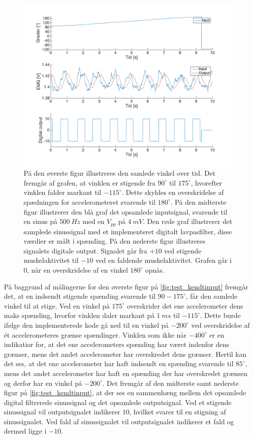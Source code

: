 \begin{figure}[H]
\centering
\includegraphics[width=1\textwidth]{figures/kontrol_test_sinus}
\caption{På den øverste figur illustreres den samlede vinkel over tid. Det fremgår af grafen, at vinklen er stigende fra $90^{\circ}$ til $175^{\circ}$, hvorefter vinklen falder markant til $-115^{\circ}$. Dette skyldes en overskridelse af spædningen for accelerometeret svarende til $180^{\circ}$.
På den midterste figur illustrerer den blå graf det opsamlede inputsignal, svarende til en sinus på $500~Hz$ med en $V_{pp}$ på $4~mV$. Den røde graf illustrerer det samplede sinussignal med et implementeret digitalt lavpasfilter, disse værdier er målt i spænding. 
På den nederste figur illustreres signalets digitale output. Signalet går fra $+10$ ved stigende muskelaktivitet til $-10$ ved en faldende muskelaktivitet. Grafen går i $0$, når en overskridelse af en vinkel $180^{\circ}$ opnås.}
\label{fig:test_kendtinput}
\end{figure}

\noindent
På baggrund af målingerne for den øverste figur på \autoref{fig:test_kendtinput} fremgår det, at en indsendt stigende spænding svarende til $90-175^{\circ}$, får den samlede vinkel til at stige. Ved en vinkel på $175^{\circ}$ overskrider det ene accelerometer dens maks spænding, hvorfor vinklen daler markant på $1~ms$ til $-115^{\circ}$. Dette burde ifølge den implementerede kode gå ned til en vinkel på $-200^{\circ}$ ved overskridelse af ét accelerometeres grænse spændinger. 
Vinklen som ikke når $-400^{\circ}$ er en indikatior for, at det ene accelerometers spænding har været indenfor dens grænser, mens det andet accelerometer har overskredet dens grænser. Hertil kan det ses, at det ene accelerometer har haft indsendt en spænding svarende til $85^{\circ}$, mens det andet accelerometer har haft en spænding der har overskredet grænsen og derfor har en vinkel på $-200^{\circ}$.
Det fremgår af den midterste samt nederste figur på \autoref{fig:test_kendtinput}, at der ses en sammenhæng mellem det opsamlede digital filtrerede sinussignal og det opsamlede outputsignal. Ved et stigende sinussignal vil outputsignalet indikerer $10$, hvilket svarer til en stigning af sinussignalet. Ved fald af sinussignalet vil outputsignalet indikerer et fald og dermed ligge i $-10$.

